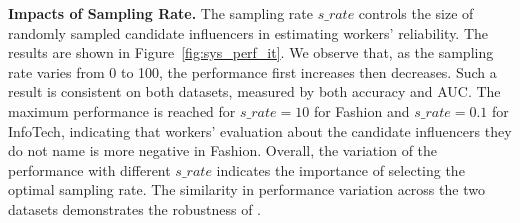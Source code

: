 \smallskip
\noindent\textbf{Impacts of Sampling Rate.}
The sampling rate $s\_rate$ controls the size of randomly sampled candidate influencers in estimating workers' reliability. The results are shown in Figure~\ref{fig:sys_perf_it}. We observe that, as the sampling rate varies from 0 to 100, the performance first increases then decreases. Such a result is consistent on both datasets, measured by both accuracy and AUC. The maximum performance is reached for $s\_rate= 10$ for Fashion and $s\_rate= 0.1$ for InfoTech, indicating that workers' evaluation about the candidate influencers they do not name is more negative in Fashion. Overall, the variation of the performance with different $s\_rate$ indicates the importance of selecting the optimal sampling rate. The similarity in performance variation across the two datasets demonstrates the robustness of \sys.

